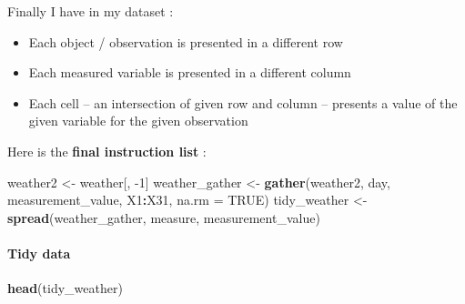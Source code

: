 \documentclass[
]{article}
\newenvironment{Shaded}{\begin{snugshade}}{\end{snugshade}}
\newcommand{\DataTypeTok}[1]{\textcolor[rgb]{0.13,0.29,0.53}{#1}}
\newcommand{\DecValTok}[1]{\textcolor[rgb]{0.00,0.00,0.81}{#1}}
\newcommand{\KeywordTok}[1]{\textcolor[rgb]{0.13,0.29,0.53}{\textbf{#1}}}
\newcommand{\NormalTok}[1]{#1}
\newcommand{\OperatorTok}[1]{\textcolor[rgb]{0.81,0.36,0.00}{\textbf{#1}}}
\newcommand{\OtherTok}[1]{\textcolor[rgb]{0.56,0.35,0.01}{#1}}
\newcommand{\StringTok}[1]{\textcolor[rgb]{0.31,0.60,0.02}{#1}}
\begin{document}
Finally I have in my dataset :

\begin{itemize}
\item
  Each object / observation is presented in a different row
\item
  Each measured variable is presented in a different column
\item
  Each cell -- an intersection of given row and column -- presents a
  value of the given variable for the given observation
\end{itemize}

Here is the \textbf{final instruction list} :

\begin{Shaded}
\begin{Highlighting}[]
\NormalTok{weather2 <-}\StringTok{ }\NormalTok{weather[, }\DecValTok{-1}\NormalTok{]}
\NormalTok{weather_gather <-}\StringTok{ }\KeywordTok{gather}\NormalTok{(weather2, day, measurement_value, X1}\OperatorTok{:}\NormalTok{X31, }\DataTypeTok{na.rm =} \OtherTok{TRUE}\NormalTok{)}
\NormalTok{tidy_weather <-}\StringTok{ }\KeywordTok{spread}\NormalTok{(weather_gather, measure, measurement_value)}
\end{Highlighting}
\end{Shaded}

\hypertarget{tidy-data}{%
\paragraph{Tidy data}\label{tidy-data}}

\begin{Shaded}
\begin{Highlighting}[]
\KeywordTok{head}\NormalTok{(tidy_weather)}
\end{Highlighting}
\end{Shaded}
\end{document}
